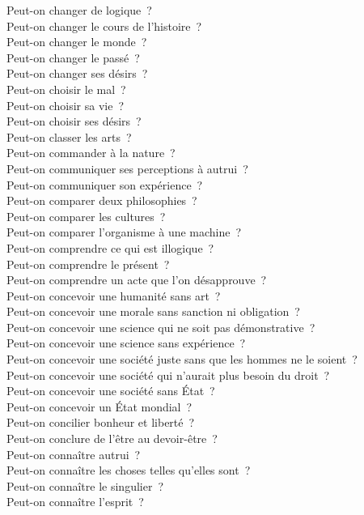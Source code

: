 \documentclass[a4paper,12pt]{article}
\begin{document}
Peut-on changer de logique ? \\
Peut-on changer le cours de l'histoire ? \\
Peut-on changer le monde ? \\
Peut-on changer le passé ? \\
Peut-on changer ses désirs ? \\
Peut-on choisir le mal ? \\
Peut-on choisir sa vie ? \\
Peut-on choisir ses désirs ? \\
Peut-on classer les arts ? \\
Peut-on commander à la nature ? \\
Peut-on communiquer ses perceptions à autrui ? \\
Peut-on communiquer son expérience ? \\
Peut-on comparer deux philosophies ? \\
Peut-on comparer les cultures ? \\
Peut-on comparer l'organisme à une machine ? \\
Peut-on comprendre ce qui est illogique ? \\
Peut-on comprendre le présent ? \\
Peut-on comprendre un acte que l'on désapprouve ? \\
Peut-on concevoir une humanité sans art ? \\
Peut-on concevoir une morale sans sanction ni obligation ? \\
Peut-on concevoir une science qui ne soit pas démonstrative ? \\
Peut-on concevoir une science sans expérience ? \\
Peut-on concevoir une société juste sans que les hommes ne le soient ? \\
Peut-on concevoir une société qui n'aurait plus besoin du droit ? \\
Peut-on concevoir une société sans État ? \\
Peut-on concevoir un État mondial ? \\
Peut-on concilier bonheur et liberté ? \\
Peut-on conclure de l'être au devoir-être ? \\
Peut-on connaître autrui ? \\
Peut-on connaître les choses telles qu'elles sont ? \\
Peut-on connaître le singulier ? \\
Peut-on connaître l'esprit ? \\
\end{document}
